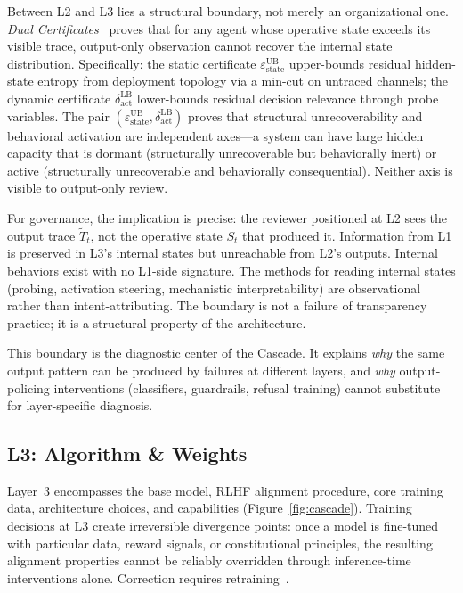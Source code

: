 \documentclass[11pt]{article}
\begin{document}
Between L2 and L3 lies a structural boundary, not merely an organizational one. \textit{Dual Certificates}~\cite{anon2026dual} proves that for any agent whose operative state exceeds its visible trace, output-only observation cannot recover the internal state distribution. Specifically: the static certificate $\varepsilon_\text{state}^\text{UB}$ upper-bounds residual hidden-state entropy from deployment topology via a min-cut on untraced channels; the dynamic certificate $\delta_\text{act}^\text{LB}$ lower-bounds residual decision relevance through probe variables. The pair $(\varepsilon_\text{state}^\text{UB}, \delta_\text{act}^\text{LB})$ proves that structural unrecoverability and behavioral activation are independent axes---a system can have large hidden capacity that is dormant (structurally unrecoverable but behaviorally inert) or active (structurally unrecoverable and behaviorally consequential). Neither axis is visible to output-only review.

For governance, the implication is precise: the reviewer positioned at L2 sees the output trace $\tilde T_t$, not the operative state $S_t$ that produced it. Information from L1 is preserved in L3's internal states but unreachable from L2's outputs. Internal behaviors exist with no L1-side signature. The methods for reading internal states (probing, activation steering, mechanistic interpretability) are observational rather than intent-attributing. The boundary is not a failure of transparency practice; it is a structural property of the architecture.

This boundary is the diagnostic center of the Cascade. It explains \textit{why} the same output pattern can be produced by failures at different layers, and \textit{why} output-policing interventions (classifiers, guardrails, refusal training) cannot substitute for layer-specific diagnosis.

\subsection{L3: Algorithm \& Weights}

Layer~3 encompasses the base model, RLHF alignment procedure, core training data, architecture choices, and capabilities (Figure~\ref{fig:cascade}). Training decisions at L3 create irreversible divergence points: once a model is fine-tuned with particular data, reward signals, or constitutional principles, the resulting alignment properties cannot be reliably overridden through inference-time interventions alone. Correction requires retraining~\cite{wei2024jailbroken, greshake2023not}.
\end{document}
